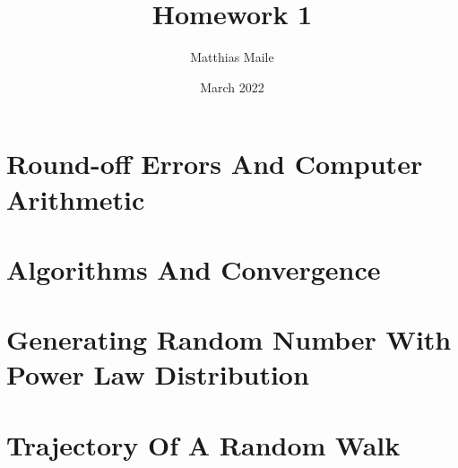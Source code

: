 \documentclass{article}
\author{Matthias Maile}
\date{March 2022}
\title{Homework 1}
\begin{document}
\maketitle
\tableofcontents

\section{Round-off Errors And Computer Arithmetic}
\label{sec:Round-off errors and Computer Arithmetic}

\section{Algorithms And Convergence}
\label{sec:Algorithms and Convergence}

\section{Generating Random Number With Power Law Distribution}
\label{sec:Generating Random Number With Power Law Distribution}

\section{Trajectory Of A Random Walk}
\label{sec:Trajectory Of A Random Walk}
\end{document}
